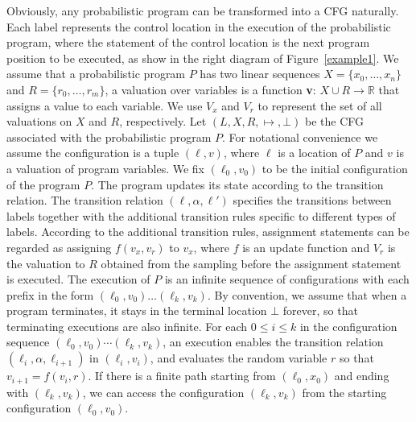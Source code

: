 \documentclass[runningheads]{llncs}
\newcommand\yx[1]{{\color{red} [YD: #1]}}
\begin{document}
Obviously, any probabilistic program can be transformed into a CFG naturally. Each label represents the control location in the execution of the probabilistic program, where the statement of the control location is the next program position to be executed, as show in the right diagram of Figure~\ref{example1}. 
We assume that a probabilistic program $P$ has two linear sequences $X=\{x_0,\dots,x_{n}\}$ and $R=\{r_0,\dots,r_{m}\}$, a valuation over variables is a function \textbf{v}: $X\cup R \to \mathbb{R}$ that assigns a value to each variable. We use $V_x$ and $V_r$ to represent the set of all valuations on $X$ and $R$, respectively. 
Let $(L,X,R,\mapsto,\bot)$ be the CFG associated with the probabilistic program $P$. For notational convenience we assume the configuration is a tuple $(\ell, v)$, where $\ell$ is a location of $P$ and $v$ is a valuation of program variables.
We fix $(\ell_0, v_0)$ to be the initial configuration of the program $P$. The program updates its state according to the transition relation. The transition relation $(\ell,\alpha,\ell')$ specifies the transitions between labels together with the additional transition rules specific to different types of labels.
According to the additional transition rules, assignment statements can be regarded as assigning $f(v_x,v_r)$ to $v_x$, where $f$ is an update function and $V_r$ is the valuation to $R$ obtained from the sampling before the assignment statement is executed.
The execution of $P$ is an infinite
sequence of configurations with each prefix in the form $(\ell_0, v_0) \dots (\ell_k, v_k)$. By convention, we assume that when a program terminates, it stays in the terminal location $\bot$ forever, so that terminating executions are also infinite. %
For each $0\leq i\leq k$ in the configuration sequence $(\ell_0,v_0) \cdots (\ell_k, v_k)$, an execution enables the transition relation $(\ell_i, \alpha, \ell_{i+1})$ in $(\ell_i, v_i)$, and evaluates the random variable $r$ so that $v_{i+1}=f(v_i,r)$. If there is a finite path starting from $(\ell_0, x_0)$ and ending with $(\ell_k, v_k)$, we can access the configuration $(\ell_k, v_k)$ from the starting configuration $(\ell_0, v_0)$. 
\end{document}
